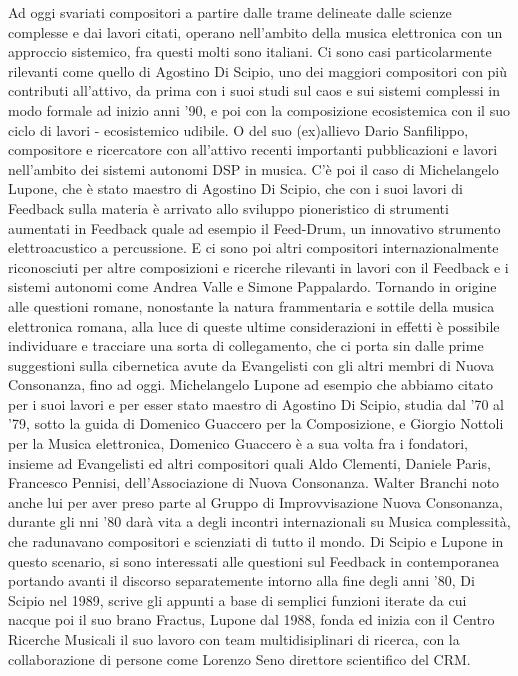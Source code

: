 Ad oggi svariati compositori a partire dalle trame delineate dalle scienze complesse e
dai lavori citati, operano nell'ambito della musica elettronica con un approccio sistemico,
fra questi molti sono italiani.
Ci sono casi particolarmente rilevanti come
quello di Agostino Di Scipio,
uno dei maggiori compositori con più contributi all'attivo,
da prima con i suoi studi sul caos e sui sistemi complessi in modo formale ad inizio
anni '90,
e poi con la composizione ecosistemica con il suo ciclo di lavori
- ecosistemico udibile.
O del suo (ex)allievo Dario Sanfilippo, compositore e ricercatore con all'attivo
recenti importanti pubblicazioni e lavori
nell'ambito dei sistemi autonomi DSP in musica.
C'è poi il caso di Michelangelo Lupone, che è stato maestro di Agostino Di Scipio,
che con i suoi lavori di Feedback sulla materia è arrivato allo sviluppo
pioneristico di strumenti aumentati in Feedback quale ad esempio il Feed-Drum,
un innovativo strumento elettroacustico a percussione.
E ci sono poi altri compositori internazionalmente riconosciuti
per altre composizioni e ricerche rilevanti in lavori con il Feedback
e i sistemi autonomi come Andrea Valle e Simone Pappalardo.
Tornando in origine alle questioni romane, nonostante la natura
frammentaria e sottile della musica elettronica romana,
alla luce di queste ultime considerazioni
in effetti è possibile individuare e tracciare una sorta di collegamento,
che ci porta sin dalle prime suggestioni sulla cibernetica avute da Evangelisti
con gli altri membri di Nuova Consonanza, fino ad oggi.
Michelangelo Lupone ad esempio che abbiamo citato per i suoi lavori
e per esser stato maestro di Agostino Di Scipio, studia dal ’70 al ’79,
sotto la guida di Domenico Guaccero per la Composizione,
e Giorgio Nottoli per la Musica elettronica,
Domenico Guaccero è a sua volta fra i fondatori, insieme ad Evangelisti
ed altri compositori
quali Aldo Clementi, Daniele Paris, Francesco Pennisi,
dell'Associazione di Nuova Consonanza.
Walter Branchi noto anche lui
per aver preso parte al Gruppo di Improvvisazione Nuova Consonanza,
durante gli nni '80 darà vita a degli incontri internazionali su
Musica complessità, che radunavano compositori e scienziati di
tutto il mondo.
Di Scipio e Lupone in questo scenario, si sono interessati alle questioni
sul Feedback in contemporanea
portando avanti il discorso separatemente intorno alla fine degli anni '80,
Di Scipio nel 1989, scrive gli appunti a base di semplici funzioni
iterate da cui nacque poi il suo brano Fractus,
Lupone dal 1988, fonda ed inizia con il Centro Ricerche Musicali il suo lavoro
con team multidisiplinari di ricerca,
con la collaborazione di persone come Lorenzo Seno direttore scientifico del CRM.

